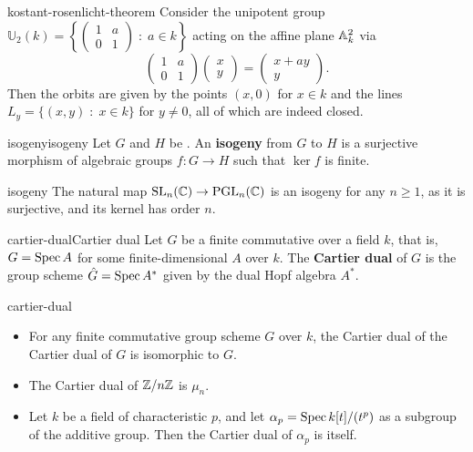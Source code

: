 \begin{example}{kostant-rosenlicht-theorem}
    Consider the unipotent group $\mathbb{U}_2(k) = \left\{ \begin{pmatrix} 1 & a \\ 0 & 1 \end{pmatrix} \;:\; a \in k \right\}$ acting on the affine plane $\AA^2_k$ via
    \[ \begin{pmatrix} 1 & a \\ 0 & 1 \end{pmatrix} \begin{pmatrix} x \\ y \end{pmatrix} = \begin{pmatrix} x + ay \\ y \end{pmatrix} . \]
    Then the orbits are given by the points $(x, 0)$ for $x \in k$ and the lines $L_y = \{ (x, y) \;:\; x \in k \}$ for $y \ne 0$, all of which are indeed closed.
\end{example}

\begin{topic}{isogeny}{isogeny}
    Let $G$ and $H$ be . An \textbf{isogeny} from $G$ to $H$ is a surjective morphism of algebraic groups $f \colon G \to H$ such that $\ker f$ is finite.
\end{topic}

\begin{example}{isogeny}
    The natural map $\textup{SL}_n(\CC) \to \textup{PGL}_n(\CC)$ is an isogeny for any $n \ge 1$, as it is surjective, and its kernel has order $n$.
\end{example}

\begin{topic}{cartier-dual}{Cartier dual}
    Let $G$ be a finite commutative  over a field $k$, that is, $G = \Spec A$ for some finite-dimensional  $A$ over $k$. The \textbf{Cartier dual} of $G$ is the group scheme $\hat{G} = \Spec A^*$ given by the dual Hopf algebra $A^*$.
\end{topic}

\begin{example}{cartier-dual}
    \begin{itemize}
        \item For any finite commutative group scheme $G$ over $k$, the Cartier dual of the Cartier dual of $G$ is isomorphic to $G$.
        \item The Cartier dual of $\ZZ/n\ZZ$ is $\mu_n$.
        \item Let $k$ be a field of characteristic $p$, and let $\alpha_p = \Spec k[t] / (t^p)$ as a subgroup of the additive group. Then the Cartier dual of $\alpha_p$ is itself.
    \end{itemize}
\end{example}

